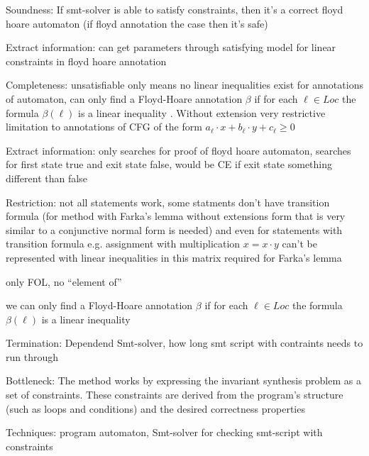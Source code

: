 \documentclass[a4paper]{article}
\begin{document}
\begin{minipage}[t]{0.16\linewidth}
\begin{betterlist}
{{\begin{betterlist}
					\item \alert{Soundness:} If smt-solver is able to satisfy constraints, then it's a correct floyd hoare automaton (if floyd annotation the case then it's safe)
					\begin{betterlist}
						\item \alert{Extract information:} can get parameters through satisfying model for linear constraints in floyd hoare annotation
					\end{betterlist}
					\item \alert{Completeness:} unsatisfiable only means no linear inequalities exist for annotations of automaton, can only find a Floyd-Hoare annotation $\beta$ if for each $\ell \in Loc$ the formula $\beta(\ell)$ is a linear inequality . \alert{Without extension} very restrictive limitation to annotations of CFG of the form $a_{\ell} \cdot  x + b_{\ell} \cdot  y + c_{\ell} \geq 0$
					\begin{betterlist}
						\item \alert{Extract information:} only searches for proof of floyd hoare automaton, searches for first state true and exit state false, would be CE if exit state something different than false
					\end{betterlist}
					\item \alert{Restriction:} not all statements work, some statments don't have transition formula (for method with Farka's lemma without extensions form that is very similar to a conjunctive normal form is needed) and even for statements with transition formula e.g. assignment with multiplication $x = x\cdot y$ can't be represented with linear inequalities in this matrix required for Farka's lemma
					\begin{betterlist}
						\item only FOL, no \enquote{element of}
						\item we can only find a Floyd-Hoare annotation $\beta$ if for each $\ell \in Loc$ the formula $\beta (\ell )$ is a linear inequality
					\end{betterlist}
					\item \alert{Termination}: Dependend Smt-solver, how long smt script with contraints needs to run through
					\item \alert{Bottleneck:} The method works by expressing the invariant synthesis problem as a set of constraints. These constraints are derived from the program's structure (such as loops and conditions) and the desired correctness properties
					\item \alert{Techniques:} program automaton, Smt-solver for checking smt-script with constraints
				\end{betterlist}
			}}
	\end{betterlist}
\end{minipage}
\end{document}

